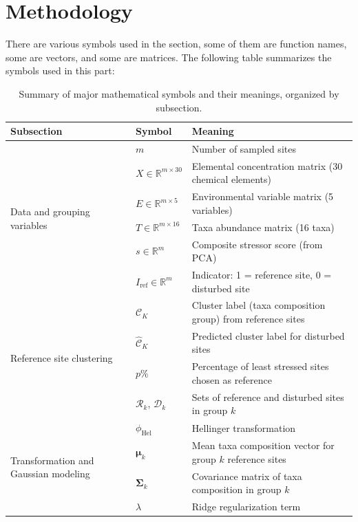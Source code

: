 \section{Methodology}

There are various symbols used in the section, some of them are function names, some are vectors, and some are 
matrices. The following table summarizes the symbols used in this part:

\begin{table}[!h]
\centering
\caption{Summary of major mathematical symbols and their meanings, organized by subsection.}
\begin{tabular}{lll}
\toprule
\textbf{Subsection} & \textbf{Symbol} & \textbf{Meaning} \\
\midrule
\multirow{6}{*}{\parbox{3cm}{\centering Data and grouping variables}} 
& $m$ & Number of sampled sites \\
& $X \in \mathbb{R}^{m \times 30}$ & Elemental concentration matrix (30 chemical elements) \\
& $E \in \mathbb{R}^{m \times 5}$ & Environmental variable matrix (5 variables) \\
& $T \in \mathbb{R}^{m \times 16}$ & Taxa abundance matrix (16 taxa) \\
& $s \in \mathbb{R}^m$ & Composite stressor score (from PCA) \\
& $I_{\mathrm{ref}} \in \mathbb{R}^m$ & Indicator: 1 = reference site, 0 = disturbed site \\
\midrule
\multirow{4}{*}{\parbox{3cm}{\centering Reference site clustering}} 
& $\mathcal{C}_K$ & Cluster label (taxa composition group) from reference sites \\
& $\hat{\mathcal{C}}_K$ & Predicted cluster label for disturbed sites \\
& $p\%$ & Percentage of least stressed sites chosen as reference \\
& $\mathcal{R}_k$, $\mathcal{D}_k$ & Sets of reference and disturbed sites in group $k$ \\
\midrule
\multirow{6}{*}{\parbox{3cm}{\centering Transformation and Gaussian modeling}} 
& $\phi_{\mathrm{Hel}}$ & Hellinger transformation \\
& $\boldsymbol{\mu}_k$ & Mean taxa composition vector for group $k$ reference sites \\
& $\boldsymbol{\Sigma}_k$ & Covariance matrix of taxa composition in group $k$ \\
& $\lambda$ & Ridge regularization term \\

\end{tabular}
\end{table}
